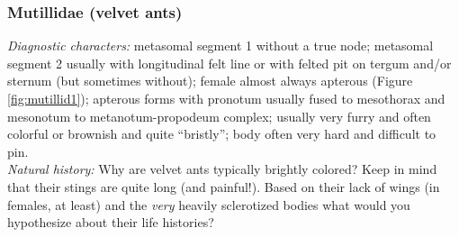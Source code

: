 \documentclass[letterpaper, 11pt]{article}
\begin{document}
\subsubsection{Mutillidae (velvet ants)}
\noindent{}\textit{Diagnostic characters:} metasomal segment 1 without a true node; metasomal segment 2 usually with longitudinal felt line or with felted pit on tergum and/or sternum (but sometimes without); female almost always apterous (Figure \ref{fig:mutillid1}); apterous forms with pronotum usually fused to mesothorax and mesonotum to metanotum-propodeum complex; usually very furry and often colorful or brownish and quite ``bristly''; body often very hard and difficult to pin.\\

\noindent{}\textit{Natural history:} Why are velvet ants typically brightly colored? Keep in mind that their stings are quite long (and painful!). Based on their lack of wings (in females, at least) and the \textit{very} heavily sclerotized bodies what would you hypothesize about their life histories?\\
\end{document}
